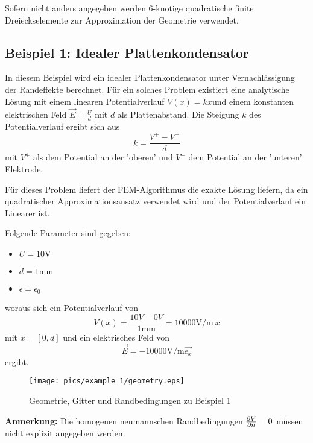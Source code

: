 Sofern nicht anders angegeben werden 6-knotige quadratische finite Dreieckselemente zur Approximation der Geometrie verwendet.

\subsection{Beispiel 1: Idealer Plattenkondensator}
In diesem Beispiel wird ein idealer Plattenkondensator unter Vernachlässigung der Randeffekte berechnet. Für ein solches Problem existiert eine analytische Lösung mit einem linearen Potentialverlauf $V(x) = kx$und einem konstanten elektrischen Feld $\vec{E} = \frac{U}{d}$ mit $d$ als Plattenabstand. Die Steigung $k$ des Potentialverlauf ergibt sich aus 
\begin{equation}
k = \frac{V^+ - V^-}{d}
\end{equation}
mit $V^+$ als dem Potential an der 'oberen' und $V^-$ dem Potential an der 'unteren' Elektrode.

Für dieses Problem liefert der FEM-Algorithmus die exakte Lösung liefern, da ein quadratischer Approximationsansatz verwendet wird und der Potentialverlauf ein Linearer ist.



Folgende Parameter sind gegeben: 
\begin{itemize}
	\item $U = 10 \si{\volt}$
	\item $d = 1 \si{\milli\meter}$
	\item $\epsilon = \epsilon_0$
\end{itemize}

woraus sich ein Potentialverlauf von 
\begin{equation}
V(x) = \frac{10V - 0V}{1\si{\milli\meter}} = 10000\si{\volt\per\meter}\ x
\end{equation} mit $x = [0,d]$ und ein elektrisches Feld von 
\begin{equation}
\vec{E} = -10000 \si{\volt\per\meter}\vec{e_x}
\end{equation}
ergibt.\newline

\begin{figure}[htbp]
	\centering
	\texttt{[image: pics/example\_1/geometry.eps]}
	\caption{Geometrie, Gitter und Randbedingungen zu Beispiel 1}
\end{figure}

\textbf{Anmerkung:} Die homogenen neumannschen Randbedingungen $\frac{\partial V}{\partial n} = 0$ müssen nicht explizit angegeben werden.\newline


